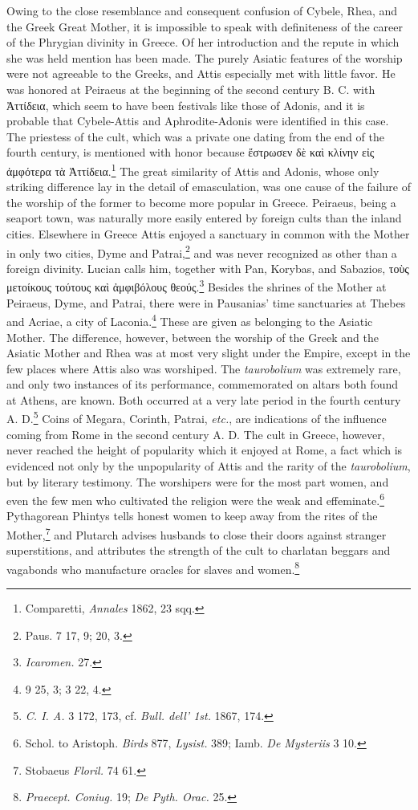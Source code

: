 \documentclass[a4paper, 11pt, oneside, polutonikogreek, english]{article}
\begin{document}
Owing to the close resemblance and consequent confusion of Cybele, Rhea, and the Greek Great Mother, it is impossible to speak with definiteness of the career of the Phrygian divinity in Greece. Of her introduction and the repute in which she was held mention has been made. The purely Asiatic features of the worship were not agreeable to the Greeks, and Attis especially met with little favor. He was honored at Peiraeus at the beginning of the second century B. C. with Ἀττίδεια, which seem to have been festivals like those of Adonis, and it is probable that Cybele-Attis and Aphrodite-Adonis were identified in this case. The priestess of the cult, which was a private one dating from the end of the fourth century, is mentioned with honor because ἔστρωσεν δὲ καὶ κλίνην εἰς ἀμφότερα τὰ Ἀττίδεια.\footnote{Comparetti, \emph{Annales} 1862, 23 sqq.} The great similarity of Attis and Adonis, whose only striking difference lay in the detail of emasculation, was one cause of the failure of the worship of the former to become more popular in Greece. Peiraeus, being a seaport town, was naturally more easily entered by foreign cults than the inland cities. Elsewhere in Greece Attis enjoyed a sanctuary in common with the Mother in only two cities, Dyme and Patrai,\footnote{Paus. 7 17, 9; 20, 3.} and was never recognized as other than a foreign divinity. Lucian calls him, together with Pan, Korybas, and Sabazios, τοὺς μετοίκους τούτους καὶ ἀμφιβόλους θεούς.\footnote{\emph{Icaromen.} 27.} Besides the shrines of the Mother at Peiraeus, Dyme, and Patrai, there were in Pausanias' time sanctuaries at Thebes and Acriae, a city of Laconia.\footnote{9 25, 3; 3 22, 4.} These are given as belonging to the Asiatic Mother. The difference, however, between the worship of the Greek and the Asiatic Mother and Rhea was at most very slight under the Empire, except in the few places where Attis also was worshiped. The \emph{taurobolium} was extremely rare, and only two instances of its performance, commemorated on altars both found at Athens, are known. Both occurred at a very late period in the fourth century A. D.\footnote{\emph{C. I. A.} 3 172, 173, cf. \emph{Bull. dell' 1st.} 1867, 174.} Coins of Megara, Corinth, Patrai, \emph{etc.}, are indications of the influence coming from Rome in the second century A. D. The cult in Greece, however, never reached the height of popularity which it enjoyed at Rome, a fact which is evidenced not only by the unpopularity of Attis and the rarity of the \emph{taurobolium}, but by literary testimony. The worshipers were for the most part women, and even the few men who cultivated the religion were the weak and effeminate.\footnote{Schol. to Aristoph. \emph{Birds} 877, \emph{Lysist.} 389; Iamb. \emph{De Mysteriis} 3 10.} Pythagorean Phintys tells honest women to keep away from the rites of the Mother,\footnote{Stobaeus \emph{Floril.} 74 61.} and Plutarch advises husbands to close their doors against stranger superstitions, and attributes the strength of the cult to charlatan beggars and vagabonds who manufacture oracles for slaves and women.\footnote{\emph{Praecept. Coniug.} 19; \emph{De Pyth. Orac.} 25.}
\end{document}
